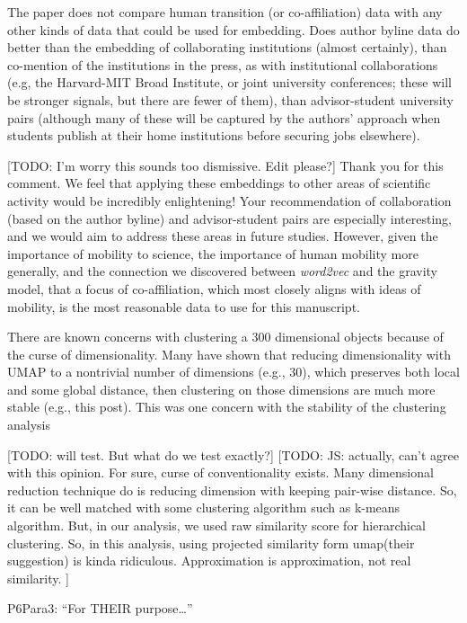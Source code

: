 \documentclass[12pt,a4paper]{article}
\newcommand{\todo}[1]{{\leavevmode\color{orange}[TODO: #1]}}
\newcommand{\response}[1]{{\leavevmode\noindent #1}}
\newcommand{\rcomment}[1]{%
\vspace{10pt}
\begin{tcolorbox}[colback=black!3,colframe=white!45!black]
#1
\end{tcolorbox}
}
\begin{document}
\rcomment{
The paper does not compare human transition (or co-affiliation) data with any other kinds of
data that could be used for embedding. Does author byline data do better than the embedding
of collaborating institutions (almost certainly), than co-mention of the institutions in the press, as
with institutional collaborations (e.g, the Harvard-MIT Broad Institute, or joint university
conferences; these will be stronger signals, but there are fewer of them), than advisor-student
university pairs (although many of these will be captured by the authors’ approach when
students publish at their home institutions before securing jobs elsewhere).
}

\response{
\todo{I'm worry this sounds too dismissive. Edit please?}
Thank you for this comment. 
We feel that applying these embeddings to other areas of scientific activity would be incredibly enlightening! 
Your recommendation of collaboration (based on the author byline) and advisor-student pairs are especially interesting, and we would aim to address these areas in future studies. 
However, given the importance of mobility to science, the importance of human mobility more generally, and the connection we discovered between \textit{word2vec} and the gravity model, that a focus of co-affiliation, which most closely aligns with ideas of mobility, is the most reasonable data to use for this manuscript. 
}


\rcomment{
There are known concerns with clustering a 300 dimensional objects because of the curse of
dimensionality. Many have shown that reducing dimensionality with UMAP to a nontrivial
number of dimensions (e.g., 30), which preserves both local and some global distance, then
clustering on those dimensions are much more stable (e.g., this post). This was one
concern with the stability of the clustering analysis


}

\response{
\todo{will test. But what do we test exactly?}
\todo{JS: actually, can't agree with this opinion. For sure, curse of  conventionality exists. Many dimensional reduction technique do is reducing dimension with keeping pair-wise distance. So, it can be well matched with some clustering algorithm such as k-means algorithm. But, in our analysis, we used raw similarity score for hierarchical clustering. So, in this analysis, using projected similarity form umap(their suggestion) is kinda ridiculous. Approximation is approximation, not real similarity.
}
}

\rcomment{
P6Para3: “For THEIR purpose…”
}
\end{document}
